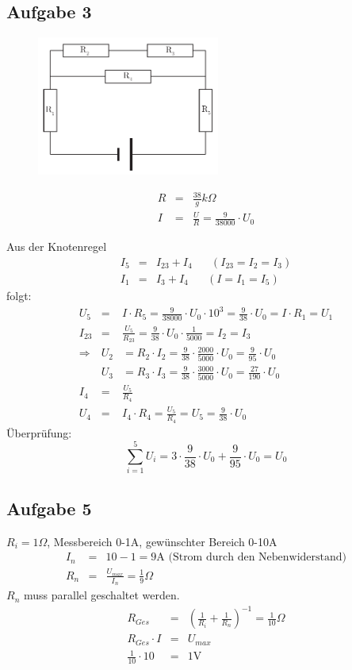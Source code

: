 \documentclass[12pt,a4paper]{article}
\begin{document}
\subsection*{Aufgabe 3}
\begin{figure}
\centering
\includegraphics[width=6cm]{exercise3.pdf}
\end{figure}
\begin{eqnarray*}
R & = & \frac{38}{g} k\Omega \\
I & = & \frac{U}{R} = \frac{9}{38000} \cdot U_0
\end{eqnarray*}

Aus der Knotenregel
\begin{eqnarray*}
I_5 & = & I_{23} + I_4 \hspace{20pt} ( I_{23} = I_2 = I_3 ) \\
I_1 & = & I_3 + I_4 \hspace{20pt} ( I = I_1 = I_5 )
\end{eqnarray*}
folgt:
\begin{eqnarray*}
U_5 & = & I \cdot R_5 = \frac{9}{38000} \cdot U_0 \cdot 10^3 = \frac{9}{38} \cdot U_0 = I \cdot R_1 = U_1 \\
I_{23} & = & \frac{U_5}{R_{23}} = \frac{9}{38} \cdot U_0 \cdot \frac{1}{5000} = I_2 = I_3 \\
\Rightarrow & U_2 & = R_2 \cdot I_2 = \frac{9}{38} \cdot \frac{2000}{5000} \cdot U_0 = \frac{9}{95} \cdot U_0 \\
& U_3 & = R_3 \cdot I_3 = \frac{9}{38} \cdot \frac{3000}{5000} \cdot U_0 = \frac{27}{190} \cdot U_0 \\
I_4 & = & \frac{U_5}{R_4} \\
U_4 & = & I_4 \cdot R_4 = \frac{U_5}{R_4} = U_5 = \frac{9}{38} \cdot U_0
\end{eqnarray*}
\"Uberpr\"ufung:
\[ \sum_{i=1}^5 U_i = 3 \cdot \frac{9}{38} \cdot U_0 + \frac{9}{95} \cdot U_0 = U_0 \]

\subsection*{Aufgabe 5}
$R_i = 1\Omega$, Messbereich 0-1A, gew\"unschter Bereich 0-10A
\begin{eqnarray*}
I_n & = & 10 - 1 = 9\mbox{A (Strom durch den Nebenwiderstand)} \\
R_n & = & \frac{U_{max}}{I_n} = \frac{1}{9}  \Omega
\end{eqnarray*}
$R_n$ muss parallel geschaltet werden.
\begin{eqnarray*}
R_{Ges} & = & \left( \frac{1}{R_i} + \frac{1}{R_n} \right) ^{-1} = \frac{1}{10}\Omega \\
R_{Ges} \cdot I & = & U_{max} \\
\frac{1}{10} \cdot 10 & = & 1 \mbox{V}
\end{eqnarray*}
\end{document}
